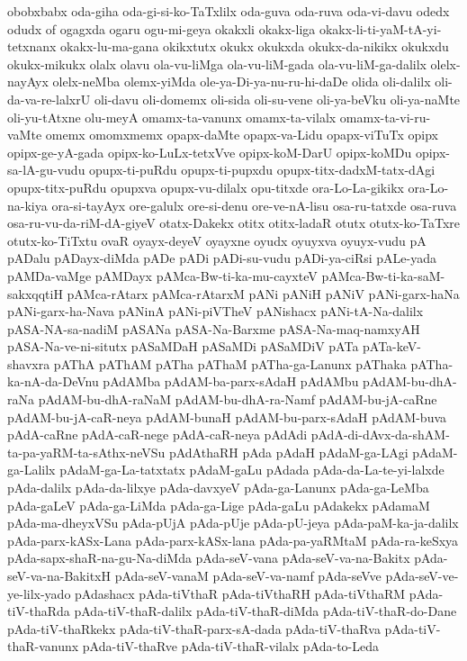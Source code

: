 {obobxbabx
oda-giha
oda-gi-si-ko-TaTxlilx
oda-guva
oda-ruva
oda-vi-davu
odedx
odudx
of
ogagxda
ogaru
ogu-mi-geya
okakxli
okakx-liga
okakx-li-ti-yaM-tA-yi-tetxnanx
okakx-lu-ma-gana
okikxtutx
okukx
okukxda
okukx-da-nikikx
okukxdu
okukx-mikukx
olalx
olavu
ola-vu-liMga
ola-vu-liM-gada
ola-vu-liM-ga-dalilx
olelx-nayAyx
olelx-neMba
olemx-yiMda
ole-ya-Di-ya-nu-ru-hi-daDe
olida
oli-dalilx
oli-da-va-re-lalxrU
oli-davu
oli-domemx
oli-sida
oli-su-vene
oli-ya-beVku
oli-ya-naMte
oli-yu-tAtxne
olu-meyA
omamx-ta-vanunx
omamx-ta-vilalx
omamx-ta-vi-ru-vaMte
omemx
omomxmemx
opapx-daMte
opapx-va-Lidu
opapx-viTuTx
opipx
opipx-ge-yA-gada
opipx-ko-LuLx-tetxVve
opipx-koM-DarU
opipx-koMDu
opipx-sa-lA-gu-vudu
opupx-ti-puRdu
opupx-ti-pupxdu
opupx-titx-dadxM-tatx-dAgi
opupx-titx-puRdu
opupxva
opupx-vu-dilalx
opu-titxde
ora-Lo-La-gikikx
ora-Lo-na-kiya
ora-si-tayAyx
ore-galulx
ore-si-denu
ore-ve-nA-lisu
osa-ru-tatxde
osa-ruva
osa-ru-vu-da-riM-dA-giyeV
otatx-Dakekx
otitx
otitx-ladaR
otutx
otutx-ko-TaTxre
otutx-ko-TiTxtu
ovaR
oyayx-deyeV
oyayxne
oyudx
oyuyxva
oyuyx-vudu
pA
pADalu
pADayx-diMda
pADe
pADi
pADi-su-vudu
pADi-ya-ciRsi
pALe-yada
pAMDa-vaMge
pAMDayx
pAMca-Bw-ti-ka-mu-cayxteV
pAMca-Bw-ti-ka-saM-sakxqqtiH
pAMca-rAtarx
pAMca-rAtarxM
pANi
pANiH
pANiV
pANi-garx-haNa
pANi-garx-ha-Nava
pANinA
pANi-piVTheV
pANishacx
pANi-tA-Na-dalilx
pASA-NA-sa-nadiM
pASANa
pASA-Na-Barxme
pASA-Na-maq-namxyAH
pASA-Na-ve-ni-situtx
pASaMDaH
pASaMDi
pASaMDiV
pATa
pATa-keV-shavxra
pAThA
pAThAM
pATha
pAThaM
pATha-ga-Lanunx
pAThaka
pATha-ka-nA-da-DeVnu
pAdAMba
pAdAM-ba-parx-sAdaH
pAdAMbu
pAdAM-bu-dhA-raNa
pAdAM-bu-dhA-raNaM
pAdAM-bu-dhA-ra-Namf
pAdAM-bu-jA-caRne
pAdAM-bu-jA-caR-neya
pAdAM-bunaH
pAdAM-bu-parx-sAdaH
pAdAM-buva
pAdA-caRne
pAdA-caR-nege
pAdA-caR-neya
pAdAdi
pAdA-di-dAvx-da-shAM-ta-pa-yaRM-ta-sAthx-neVSu
pAdAthaRH
pAda
pAdaH
pAdaM-ga-LAgi
pAdaM-ga-Lalilx
pAdaM-ga-La-tatxtatx
pAdaM-gaLu
pAdada
pAda-da-La-te-yi-lalxde
pAda-dalilx
pAda-da-lilxye
pAda-davxyeV
pAda-ga-Lanunx
pAda-ga-LeMba
pAda-gaLeV
pAda-ga-LiMda
pAda-ga-Lige
pAda-gaLu
pAdakekx
pAdamaM
pAda-ma-dheyxVSu
pAda-pUjA
pAda-pUje
pAda-pU-jeya
pAda-paM-ka-ja-dalilx
pAda-parx-kASx-Lana
pAda-parx-kASx-lana
pAda-pa-yaRMtaM
pAda-ra-keSxya
pAda-sapx-shaR-na-gu-Na-diMda
pAda-seV-vana
pAda-seV-va-na-Bakitx
pAda-seV-va-na-BakitxH
pAda-seV-vanaM
pAda-seV-va-namf
pAda-seVve
pAda-seV-ve-ye-lilx-yado
pAdashacx
pAda-tiVthaR
pAda-tiVthaRH
pAda-tiVthaRM
pAda-tiV-thaRda
pAda-tiV-thaR-dalilx
pAda-tiV-thaR-diMda
pAda-tiV-thaR-do-Dane
pAda-tiV-thaRkekx
pAda-tiV-thaR-parx-sA-dada
pAda-tiV-thaRva
pAda-tiV-thaR-vanunx
pAda-tiV-thaRve
pAda-tiV-thaR-vilalx
pAda-to-Leda
}
